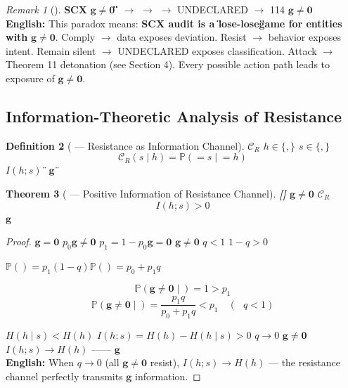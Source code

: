 \documentclass[12pt,a4paper]{article}
\newtheorem{theorem}{Theorem}[section]
\newtheorem{definition}[theorem]{Definition}
\theoremstyle{remark}
\newtheorem{remark}[theorem]{Remark}
\newcommand{\Pbb}{\mathbb{P}}
\newcommand{\g}{\mathbf{g}}
\newcommand{\rigorFull}{\textnormal{\textbf{[]}}}
\begin{document}
\begin{remark}[]
\textbf{SCX} $ \g \neq \mathbf{0} $ \textbf{\"\"}  $ \to $  $ \to $  $ \to $ UNDECLARED $ \to $ 114 $ \g \neq \mathbf{0} $ \\
\textbf{English:} This paradox means: \textbf{SCX audit is a \"lose-lose\" game for entities with} $ \g \neq \mathbf{0} $. Comply $ \to $ data exposes deviation. Resist $ \to $ behavior exposes intent. Remain silent $ \to $ UNDECLARED exposes classification. Attack $ \to $ Theorem 11 detonation (see Section 4). Every possible action path leads to exposure of $ \g \neq \mathbf{0} $.
\end{remark}

\subsection{}
\subsection{Information-Theoretic Analysis of Resistance}

\begin{definition}[ — Resistance as Information Channel]\label{def:resistance_channel}
\textbf{} $ \mathcal{C}_R $  $ h \in \{\text{}, \text{}\} $  $ s \in \{\text{}, \text{}\} $ 
\begin{equation}
    \mathcal{C}_R(s \mid h) = \Pbb(\text{} = s \mid \text{} = h)
\end{equation}
 $ I(h; s) $ \" $ \g $ \"
\end{definition}

\begin{theorem}[ — Positive Information of Resistance Channel]\label{thm:positive_info}\rigorFull
 $ \g \neq \mathbf{0} $  $ \mathcal{C}_R $ 
\begin{equation}
    I(h; s) > 0
\end{equation}
 $ \g $ 
\end{theorem}

\begin{proof}
 $ \g = \mathbf{0} $  $ p_0 $$ \g \neq \mathbf{0} $  $ p_1 = 1 - p_0 $$ \g = \mathbf{0} $ $ \g \neq \mathbf{0} $  $ q < 1 $  $ 1 - q > 0 $ 

 $ \Pbb(\text{}) = p_1(1-q) $$ \Pbb(\text{}) = p_0 + p_1 q $


\begin{equation}
    \Pbb(\g \neq \mathbf{0} \mid \text{}) = 1 > p_1
\end{equation}
\begin{equation}
    \Pbb(\g \neq \mathbf{0} \mid \text{}) = \frac{p_1 q}{p_0 + p_1 q} < p_1 \quad (\text{ } q < 1)
\end{equation}

 $ H(h \mid s) < H(h) $ $ I(h; s) = H(h) - H(h \mid s) > 0 $ $ q \to 0 $ $ \g \neq \mathbf{0} $ $ I(h; s) \to H(h) $ ——  $ \g $ \\
\textbf{English:} When $ q \to 0 $ (all $ \g \neq \mathbf{0} $ resist), $ I(h; s) \to H(h) $ — the resistance channel perfectly transmits $ \g $ information.
\end{proof}
\end{document}
